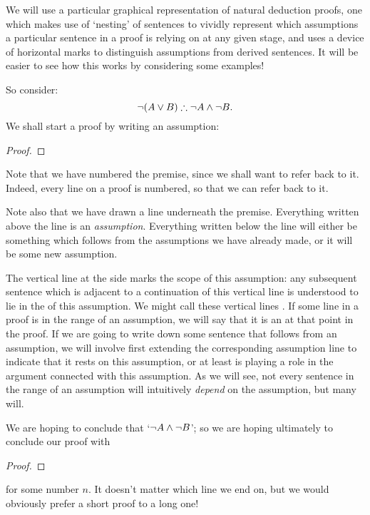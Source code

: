We will use a particular graphical representation of natural deduction proofs, one which makes use of `nesting' of sentences to vividly represent which assumptions a particular sentence in a proof is relying on at any given stage, and uses a device of horizontal marks to distinguish assumptions from derived sentences. It will be easier to see how this works by considering some examples!

So consider:
	$$\neg (A \vee B) \mathrel{\therefore} \neg A \wedge \neg B.$$
We shall start a proof by writing an assumption:
\begin{proof}
\end{proof}
Note that we have numbered the premise, since we shall want to refer back to it. Indeed, every line on a proof is numbered, so that we can refer back to it.



Note also that we have drawn a line underneath the premise. Everything written above the line is an \emph{assumption}. Everything written below the line will either be something which follows from the assumptions we have already made, or it will be some new assumption. 

The vertical line at the side marks the scope of this assumption: any subsequent sentence which is adjacent to a continuation of this vertical line is understood to lie in the  of this assumption. We might call these vertical lines . If some line in a proof is in the range of an assumption, we will say that it is an  at that point in the proof. If we are going to write down some sentence that follows from an assumption, we will involve first extending the corresponding assumption line to indicate that it rests on this assumption, or at least is playing a role in the argument connected with this assumption. As we will see, not every sentence in the range of an assumption will intuitively \emph{depend} on the assumption, but many will. \label{nondependence}

We are hoping to conclude that `$\neg A \wedge \neg B$'; so we are hoping ultimately to conclude our proof with
\begin{proof}
\end{proof}
for some number $n$. It doesn't matter which line we end on, but we would obviously prefer a short proof to a long one!

